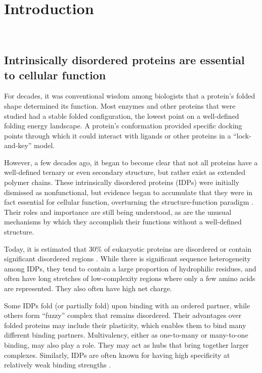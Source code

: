 \chapter{Introduction}~\label{ch01_introduction}


\section{Intrinsically disordered proteins are essential to cellular function}
For decades, it was conventional wisdom among biologists that a protein's folded shape determined its function.  Most enzymes and other proteins that were studied had a stable folded configuration, the lowest point on a well-defined folding energy landscape.  A protein's conformation provided specific docking points through which it could interact with ligands or other proteins in a ``lock-and-key'' model.

However, a few decades ago, it began to become clear that not all proteins have a well-defined ternary or even secondary structure, but rather exist as extended polymer chains.  These intrinsically disordered proteins (IDPs) were initially dismissed as nonfunctional, but evidence began to accumulate that they were in fact essential for cellular function, overturning the structure-function paradigm \cite{uversky13}.  Their roles and importance are still being understood, as are the unusual mechanisms by which they accomplish their functions without a well-defined structure.

Today, it is estimated that 30\% of eukaryotic proteins are disordered or contain significant disordered regions \cite{uversky13}.  While there is significant sequence heterogeneity among IDPs, they tend to contain a large proportion of hydrophilic residues, and often have long stretches of low-complexity regions where only a few amino acids are represented.  They also often have high net charge.

Some IDPs fold (or partially fold) upon binding with an ordered partner, while others form ``fuzzy'' complex that remains disordered.  Their advantages over folded proteins may include their plasticity, which enables them to bind many different binding partners.  Multivalency, either as one-to-many or many-to-one binding, may also play a role.  They may act as hubs that bring together larger complexes.  Similarly, IDPs are often known for having high specificity at relatively weak binding strengths \cite{uversky13}.

